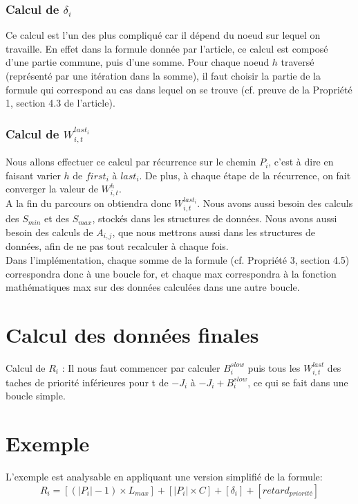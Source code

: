 \documentclass[10pt,a4paper]{article}
\begin{document}
\subsubsection{Calcul de $\delta_i$}
Ce calcul est l'un des plus compliqué car il dépend du noeud sur lequel on 
travaille. En effet dans la formule donnée par l'article, ce calcul est composé 
d'une partie commune, puis d'une somme. Pour chaque noeud $h$ traversé 
(représenté par une itération dans la somme), il faut choisir la partie de la 
formule qui correspond au cas dans lequel on se trouve (cf. preuve de la 
Propriété 1, section 4.3 de l'article).

\subsubsection{Calcul de $W_{i,t}^{last_i}$}

Nous allons effectuer ce calcul par récurrence sur le chemin $P_i$, c'est à 
dire en faisant varier $h$ de $first_i$ à $last_i$. De plus, à chaque étape de 
la récurrence, on fait converger la valeur de $W_{i,t}^h$.\\
A la fin du parcours on obtiendra donc $W_{i,t}^{last_i}$. 
Nous avons aussi besoin des calculs des ${S_{min}}$ et des 
$S_{max}$, stockés dans les
structures de données. Nous avons aussi besoin des calculs de $A_{i,j}$, que nous mettrons aussi 
dans les structures de données, afin de ne pas tout recalculer à chaque fois.\\
Dans l'implémentation, chaque somme de la formule (cf. Propriété 3, section 
4.5) correspondra donc à une boucle for, et chaque max correspondra à la 
fonction mathématiques max sur des données calculées dans une autre boucle.


\section{Calcul des données finales}
Calcul de $R_i$ : Il nous faut commencer par calculer $B_i^{slow}$ puis tous les $W_{i,t}^{last}$ 
des taches de priorité inférieures pour t de $-J_i$ à $-J_i + B_i^{slow}$, ce qui se fait dans 
une boucle simple.


\section{Exemple}
L'exemple est analysable en appliquant une version simplifié de la formule:
\[R_{i} = [(|P_i| - 1 ) \times L_{max}] + [|P_i| \times C] + [\delta_i]  + [retard_{priorité}]\]
\end{document}
